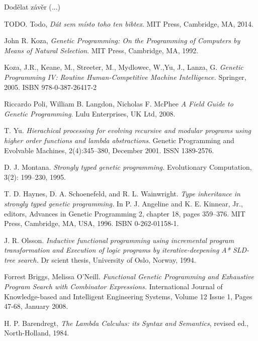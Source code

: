 \documentclass[conference]{IEEEtran}
\begin{document}
Dodělat závěr (...)


\begin{thebibliography}{22}

  TODO. Todo,
  \emph{Dát sem místo toho ten bibtex}.
  MIT Press, Cambridge, MA,
  2014. 

  John R. Koza,
  \emph{Genetic Programming: On the Programming of Computers by Means of Natural Selection}.
  MIT Press, Cambridge, MA,
  1992. 

  Koza, J.R., Keane, M., Streeter, M., Mydlowec, W.,Yu, J., Lanza, G. 
  \emph{Genetic Programming IV: Routine Human-Competitive Machine Intelligence.} 
  Springer, 2005. ISBN 978-0-387-26417-2 

 Riccardo Poli, William B. Langdon, Nicholas F. McPhee
 \emph{A Field Guide to Genetic Programming}.
 Lulu Enterprises, UK Ltd, 2008.

  T. Yu. 
  \emph{Hierachical processing for evolving recursive and modular 
        programs using higher order functions and lambda abstractions}. 
  Genetic Programming and Evolvable Machines,
  2(4):345–380, December 2001. ISSN 1389-2576.


D. J. Montana. 
\emph{Strongly typed genetic programming.} 
Evolutionary Computation, 3(2): 199–230, 1995.

T. D. Haynes, D. A. Schoenefeld, and R. L. Wainwright. 
\emph{Type inheritance in strongly typed genetic programming.} 
In P. J. Angeline and K. E. Kinnear, Jr., editors, Advances
in Genetic Programming 2, chapter 18, pages 359–376.
MIT Press, Cambridge, MA, USA, 1996. ISBN 0-262-01158-1. 

J. R. Olsson. 
\emph{Inductive functional programming using incremental program 
transformation and Execution of logic programs by 
iterative-deepening A* SLD-tree search.} 
Dr scient thesis, University of Oslo, Norway, 1994.

Forrest Briggs, Melissa O’Neill.
\emph{Functional Genetic Programming and Exhaustive
Program Search with Combinator Expressions.}
International Journal of Knowledge-based and Intelligent Engineering Systems,
Volume 12 Issue 1, Pages 47-68, January 2008. 


H. P. Barendregt,
\emph{The Lambda Calculus: its Syntax and Semantics}, 
revised ed., North-Holland, 1984.


\end{thebibliography}
\end{document}
